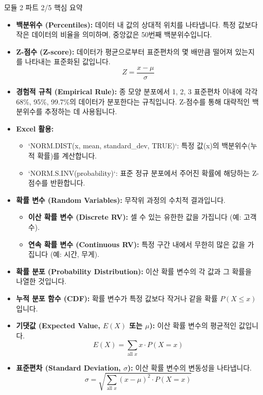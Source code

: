 \documentclass[11pt,a4paper]{article}
\begin{document}
\begin{infobox}{모듈 2 파트 2/5 핵심 요약}
\begin{itemize}
    \item \textbf{백분위수 (Percentiles):} 데이터 내 값의 상대적 위치를 나타냅니다. 특정 값보다 작은 데이터의 비율을 의미하며, 중앙값은 50번째 백분위수입니다.
    \item \textbf{Z-점수 (Z-score):} 데이터가 평균으로부터 표준편차의 몇 배만큼 떨어져 있는지를 나타내는 표준화된 값입니다.
    \[ Z = \frac{x - \mu}{\sigma} \]
    \item \textbf{경험적 규칙 (Empirical Rule):} 종 모양 분포에서 1, 2, 3 표준편차 이내에 각각 68\%, 95\%, 99.7\%의 데이터가 분포한다는 규칙입니다. Z-점수를 통해 대략적인 백분위수를 추정하는 데 사용됩니다.
    \item \textbf{Excel 활용:}
    \begin{itemize}
        \item `NORM.DIST(x, mean, standard\_dev, TRUE)`: 특정 값(x)의 백분위수(누적 확률)를 계산합니다.
        \item `NORM.S.INV(probability)`: 표준 정규 분포에서 주어진 확률에 해당하는 Z-점수를 반환합니다.
    \end{itemize}
    \item \textbf{확률 변수 (Random Variables):} 무작위 과정의 수치적 결과입니다.
    \begin{itemize}
        \item \textbf{이산 확률 변수 (Discrete RV):} 셀 수 있는 유한한 값을 가집니다 (예: 고객 수).
        \item \textbf{연속 확률 변수 (Continuous RV):} 특정 구간 내에서 무한히 많은 값을 가집니다 (예: 시간, 무게).
    \end{itemize}
    \item \textbf{확률 분포 (Probability Distribution):} 이산 확률 변수의 각 값과 그 확률을 나열한 것입니다.
    \item \textbf{누적 분포 함수 (CDF):} 확률 변수가 특정 값보다 작거나 같을 확률 \(P(X \le x)\)입니다.
    \item \textbf{기댓값 (Expected Value, \(E(X)\) 또는 \(\mu\)):} 이산 확률 변수의 평균적인 값입니다.
    \[ E(X) = \sum_{\text{all } x} x \cdot P(X=x) \]
    \item \textbf{표준편차 (Standard Deviation, \(\sigma\)):} 이산 확률 변수의 변동성을 나타냅니다.
    \[ \sigma = \sqrt{\sum_{\text{all } x} (x - \mu)^2 \cdot P(X=x)} \]
\end{itemize}
\end{infobox}
\end{document}
